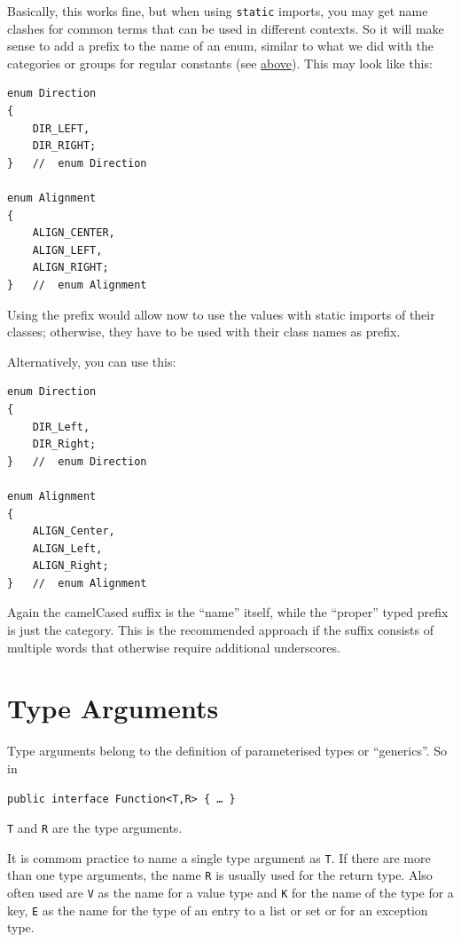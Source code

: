 \documentclass[11pt,a4paper, titlepage, parskip=half, headsepline, footsepline, cleardoublepage=current, headheight=1cm]{scrbook}
\begin{document}
Basically, this works fine, but when using \lstinline|static| imports, you may get name clashes for common terms that can be used in different contexts. So it will make sense to add a prefix to the name of an enum, similar to what we did with the categories or groups for regular constants (see \hyperref[sec:Constants]{above}). This may look like this:
\begin{lstlisting}
enum Direction
{
    DIR_LEFT,
    DIR_RIGHT;
}   //  enum Direction

enum Alignment
{
    ALIGN_CENTER,
    ALIGN_LEFT,
    ALIGN_RIGHT;
}   //  enum Alignment
\end{lstlisting}
Using the prefix would allow now to use the values with static imports of their classes; otherwise, they have to be used with their class names as prefix.

Alternatively, you can use this:
\begin{lstlisting}
enum Direction
{
    DIR_Left,
    DIR_Right;
}   //  enum Direction

enum Alignment
{
    ALIGN_Center,
    ALIGN_Left,
    ALIGN_Right;
}   //  enum Alignment
\end{lstlisting}
Again the camelCased suffix is the “name” itself, while the “proper” typed prefix is just the category. This is the recommended approach if the suffix consists of multiple words that otherwise require additional underscores.


\section{Type Arguments}\label{sec:TypeVariables}
Type arguments belong to the definition of parameterised types \autocite{ORACLE_DOC_LANGUAGE_SPECIFICATION:ParameterizedTypes} or “generics”. So in
\begin{lstlisting}
public interface Function<T,R> { … }
\end{lstlisting}
\verb#T# and \verb#R# are the type arguments.

It is commom practice to name a single type argument as \lstinline|T|. If there are more than one type arguments, the name \lstinline|R| is usually used for the return type. Also often used are \lstinline|V| as the name for a value type and \lstinline|K| for the name of the type for a key, \lstinline|E| as the name for the type of an entry to a list or set or for an exception type.
\end{document}
